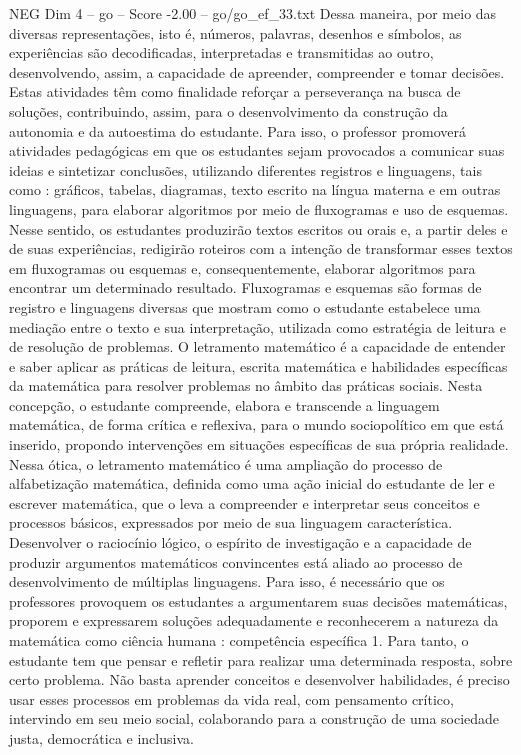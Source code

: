 \begin{textsample}{NEG Dim 4 – go – Score -2.00 – go/go\_ef\_33.txt}
Dessa maneira, por meio das diversas representações, isto é, números, palavras, desenhos e símbolos, as experiências são decodificadas, interpretadas e transmitidas ao outro, desenvolvendo, assim, a capacidade de apreender, compreender e tomar decisões.
Estas atividades têm como finalidade reforçar a perseverança na busca de soluções, contribuindo, assim, para o desenvolvimento da construção da autonomia e da autoestima do estudante.
Para isso, o professor promoverá atividades pedagógicas em que os estudantes sejam provocados a comunicar suas ideias e sintetizar conclusões, utilizando diferentes registros e linguagens, tais como : gráficos, tabelas, diagramas, texto escrito na língua materna e em outras linguagens, para elaborar algoritmos por meio de fluxogramas e uso de esquemas.
Nesse sentido, os estudantes produzirão textos escritos ou orais e, a partir deles e de suas experiências, redigirão roteiros com a intenção de transformar esses textos em fluxogramas ou esquemas e, consequentemente, elaborar algoritmos para encontrar um determinado resultado.
Fluxogramas e esquemas são formas de registro e linguagens diversas que mostram como o estudante estabelece uma mediação entre o texto e sua interpretação, utilizada como estratégia de leitura e de resolução de problemas.
O letramento matemático é a capacidade de entender e saber aplicar as práticas de leitura, escrita matemática e habilidades específicas da matemática para resolver problemas no âmbito das práticas sociais.
Nesta concepção, o estudante compreende, elabora e transcende a linguagem matemática, de forma crítica e reflexiva, para o mundo sociopolítico em que está inserido, propondo intervenções em situações específicas de sua própria realidade.
Nessa ótica, o letramento matemático é uma ampliação do processo de alfabetização matemática, definida como uma ação inicial do estudante de ler e escrever matemática, que o leva a compreender e interpretar seus conceitos e processos básicos, expressados por meio de sua linguagem característica.
Desenvolver o raciocínio lógico, o espírito de investigação e a capacidade de produzir argumentos matemáticos convincentes está aliado ao processo de desenvolvimento de múltiplas linguagens.
Para isso, é necessário que os professores provoquem os estudantes a argumentarem suas decisões matemáticas, proporem e expressarem soluções adequadamente e reconhecerem a natureza da matemática como ciência humana : competência específica 1.
Para tanto, o estudante tem que pensar e refletir para realizar uma determinada resposta, sobre certo problema.
Não basta aprender conceitos e desenvolver habilidades, é preciso usar esses processos em problemas da vida real, com pensamento crítico, intervindo em seu meio social, colaborando para a construção de uma sociedade justa, democrática e inclusiva.

\end{textsample}
